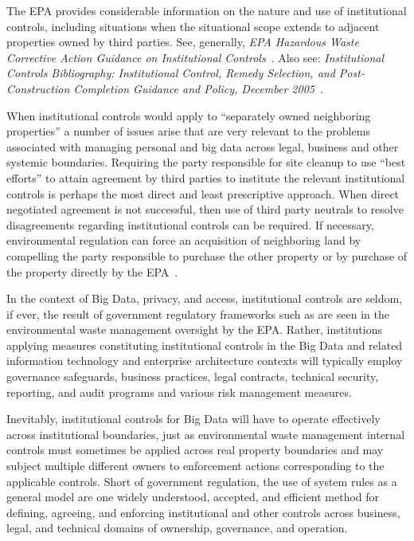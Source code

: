 The EPA provides considerable information on the nature and use of institutional controls, including situations when the situational scope extends to adjacent properties owned by third parties.
See, generally, {\em EPA Hazardous Waste Corrective Action Guidance on Institutional Controls}~\cite{EPA2007}.
Also see: {\em Institutional Controls Bibliography: Institutional Control, Remedy Selection, and Post-Construction Completion Guidance and Policy, December 2005}~\cite{EPAbibliography2005}.

When institutional controls would apply to ``separately owned neighboring properties'' a number of issues arise that are very relevant to the problems associated with managing personal and big data across legal, business and other systemic boundaries.
Requiring the party responsible for site cleanup to use ``best efforts'' to attain agreement by third parties to institute the relevant institutional controls is perhaps the most direct and least prescriptive approach.  When direct negotiated agreement is not successful, then use of third party neutrals to resolve disagreements regarding institutional controls can be required.  If necessary, environmental regulation can force an acquisition of neighboring land by compelling the party responsible to purchase the other property or by purchase of the property directly by the EPA~\cite{EPA-540-R-09-001}.

In the context of Big Data, privacy, and access, institutional controls are seldom, if ever, the result of government regulatory frameworks such as are seen in the environmental waste management oversight by the EPA.
Rather, institutions applying measures constituting institutional controls in the Big Data and related information technology and enterprise architecture contexts will typically employ governance safeguards, business practices, legal contracts, technical security, reporting, and audit programs and various risk management measures.

Inevitably, institutional controls for Big Data will have to operate effectively across institutional boundaries, just as environmental waste management internal controls must sometimes be applied across real property boundaries and may subject multiple different owners to enforcement actions corresponding to the applicable controls.
Short of government regulation, the use of system rules as a general model are one widely understood, accepted, and efficient method for defining, agreeing, and enforcing institutional and other controls across business, legal, and technical domains of ownership, governance, and operation.

